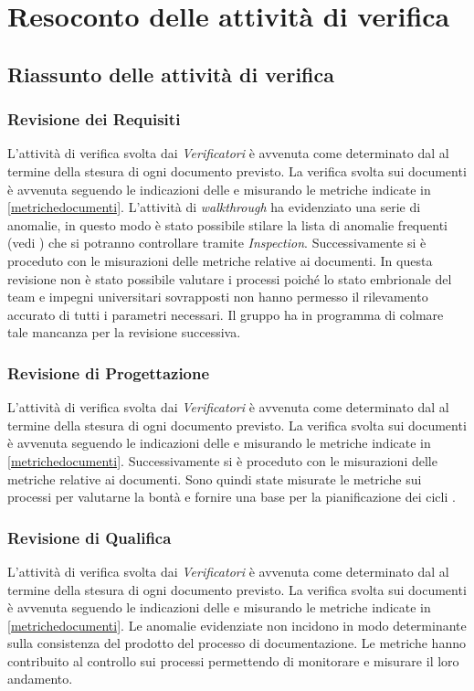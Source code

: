 \section{Resoconto delle attività di verifica}

	\subsection{Riassunto delle attività di verifica}
	\label{RiassuntoAttivitaVerifica}
	
	 	\subsubsection{Revisione dei Requisiti}
	 	L'attività di verifica svolta dai \emph{Verificatori} è avvenuta come determinato dal \PianoDiProgetto{} al termine della stesura di ogni documento previsto. La verifica svolta sui documenti è avvenuta seguendo le indicazioni delle \NormeDiProgetto{} e misurando le metriche indicate in \ref{metrichedocumenti}. L'attività di \emph{walkthrough} ha evidenziato una serie di anomalie, in questo modo è stato possibile stilare la lista di anomalie frequenti (vedi \NormeDiProgetto{}) che si potranno controllare tramite \emph{Inspection}. Successivamente si è proceduto con le misurazioni delle metriche relative ai documenti.
		In questa revisione non è stato possibile valutare i processi poiché lo stato embrionale del team e impegni universitari sovrapposti non hanno permesso il rilevamento accurato di tutti i parametri necessari. Il gruppo ha in programma di colmare tale mancanza per la revisione successiva.


		\subsubsection{Revisione di Progettazione}
		L'attività di verifica svolta dai \emph{Verificatori} è avvenuta come determinato dal \PianoDiProgetto{} al termine della stesura di ogni documento previsto. La verifica svolta sui documenti è avvenuta seguendo le indicazioni delle \NormeDiProgetto{} e misurando le metriche indicate in \ref{metrichedocumenti}. Successivamente si è proceduto con le misurazioni delle metriche relative ai documenti.
		Sono quindi state misurate le metriche sui processi per valutarne la bontà e fornire una base per la pianificazione dei cicli .

	
		\subsubsection{Revisione di Qualifica}
		L'attività di verifica svolta dai \emph{Verificatori} è avvenuta come determinato dal \PianoDiProgetto{} al termine della stesura di ogni documento previsto. La verifica svolta sui documenti è avvenuta seguendo le indicazioni delle \NormeDiProgetto{} e misurando le metriche indicate in \ref{metrichedocumenti}. Le anomalie evidenziate non incidono in modo determinante sulla consistenza del prodotto del processo di documentazione. Le metriche hanno contribuito al controllo sui processi permettendo di monitorare e misurare il loro andamento. 


